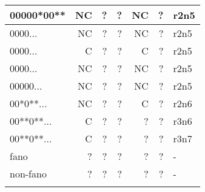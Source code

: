 \begin{center}
\begin{tabular}{ | l | r | r | r | r | r |p{2.5cm} |}
     00000*00** & NC &  ? & ? & NC & ? & r2n5 \\ \hline
     0000... & NC &  ? & ? & NC & ? & r2n5 \\ \hline
     0000... & C &  ? & ? & C & ? & r2n5 \\ \hline
     0000...& NC &  ? & ? & NC &  ? &r2n5 \\ \hline
     00000... & NC &  ? & ? & NC & ? & r2n5 \\ \hline
     00*0**... & NC &  ? & ? & C & ? & r2n6 \\ \hline
     00**0**...& C &  ? & ? & ? & ? & r3n6 \\ \hline
     00**0**...& C &  ? & ? & ? & ? & r3n7 \\ \hline
    fano &  ? & ? & ? & ? & ? & - \\ \hline
    non-fano &  ? & ? & ? & ? & ? & - \\ \hline
    \label{Tab:computational-results}
    \end{tabular}
\end{center}




 
